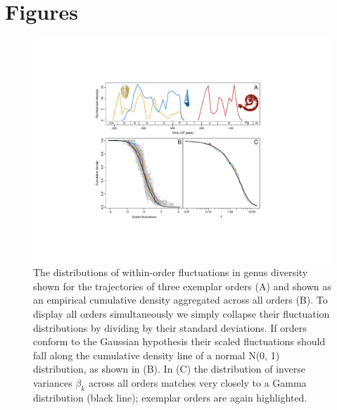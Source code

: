 \documentclass[12pt]{article}
\begin{document}
\printbibliography

\clearpage

\section*{Figures}

\begin{figure}[!h]
  \centering
  \includegraphics[scale=0.8]{figs/fig_pkx-fbeta.pdf}
  \caption[Variability in trajectories of within-order fluctuations in
  genus diversity]{The distributions of within-order fluctuations in
    genus diversity shown for the trajectories of three exemplar
    orders (A) and shown as an empirical cumulative density aggregated
    across all orders (B). To display all orders simultaneously we
    simply collapse their fluctuation distributions by dividing by
    their standard deviations. If orders conform to the Gaussian
    hypothesis their scaled fluctuations should fall along the
    cumulative density line of a normal N(0, 1) distribution, as shown
    in (B). In (C) the distribution of inverse variances $\beta_k$
    across all orders matches very closely to a Gamma distribution
    (black line); exemplar orders are again highlighted.}
  \label{fig:pk_f}
\end{figure}
\end{document}
